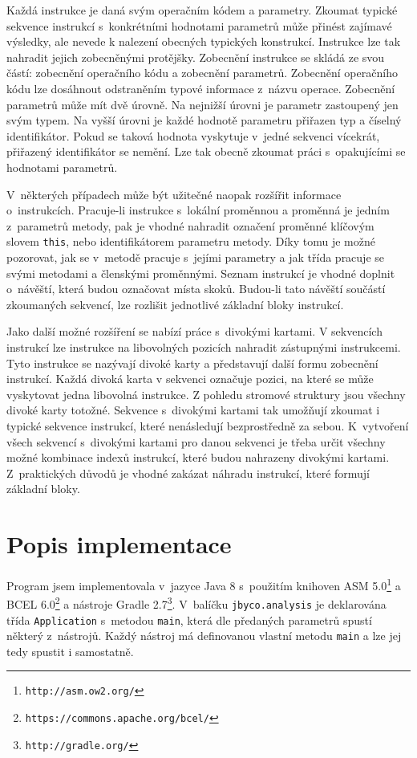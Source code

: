 Každá instrukce je daná svým operačním kódem a parametry. Zkoumat typické sekvence instrukcí s~konkrétními hodnotami parametrů může přinést zajímavé výsledky, ale nevede k nalezení obecných typických konstrukcí. Instrukce lze tak nahradit jejich zobecněnými protějšky. Zobecnění instrukce se skládá ze svou částí: zobecnění operačního kódu a zobecnění parametrů. Zobecnění operačního kódu lze dosáhnout odstraněním typové informace z~názvu operace. Zobecnění parametrů může mít dvě úrovně. Na nejnižší úrovni je parametr zastoupený jen svým typem. Na vyšší úrovni je každé hodnotě parametru přiřazen typ a číselný identifikátor. Pokud se taková hodnota vyskytuje v~jedné sekvenci vícekrát, přiřazený identifikátor se nemění. Lze tak obecně zkoumat práci s~opakujícími se hodnotami parametrů.

V~některých případech může být užitečné naopak rozšířit informace o~instrukcích. Pracuje-li instrukce s~lokální proměnnou a proměnná je jedním z~parametrů metody, pak je vhodné nahradit označení proměnné klíčovým slovem \texttt{this}, nebo identifikátorem parametru metody. Díky tomu je možné pozorovat, jak se v~metodě pracuje s~jejími parametry a jak třída pracuje se svými metodami a členskými proměnnými.
Seznam instrukcí je vhodné doplnit o~návěští, která budou označovat místa skoků. Budou-li tato návěští součástí zkoumaných sekvencí, lze rozlišit jednotlivé základní bloky instrukcí.

Jako další možné rozšíření se nabízí práce s~divokými kartami.
V sekvencích instrukcí lze instrukce na libovolných pozicích nahradit zástupnými instrukcemi.
Tyto instrukce se nazývají divoké karty a představují další formu zobecnění instrukcí. Každá divoká karta v sekvenci označuje pozici, na které se může vyskytovat jedna libovolná instrukce. Z pohledu stromové struktury jsou všechny divoké karty totožné.
 Sekvence s~divokými kartami tak umožňují zkoumat i typické sekvence instrukcí, které nenásledují bezprostředně za sebou. K~vytvoření všech sekvencí s~divokými kartami pro danou sekvenci je třeba určit všechny možné kombinace indexů instrukcí, které budou nahrazeny divokými kartami. Z~praktických důvodů je vhodné zakázat náhradu instrukcí, které formují základní bloky.

\section{Popis implementace}\label{Jbyca:Implementation}

Program jsem implementovala v~jazyce Java 8 s~použitím knihoven ASM 5.0\footnote{\texttt{http://asm.ow2.org/}} a BCEL 6.0\footnote{\texttt{https://commons.apache.org/bcel/}} a nástroje Gradle 2.7\footnote{\texttt{http://gradle.org/}}. V~balíčku \texttt{jbyco.analysis} je deklarována třída \texttt{Application} s~metodou \texttt{main}, která dle předaných parametrů spustí některý z~nástrojů. Každý nástroj má definovanou vlastní metodu \texttt{main} a lze jej tedy spustit i samostatně.

